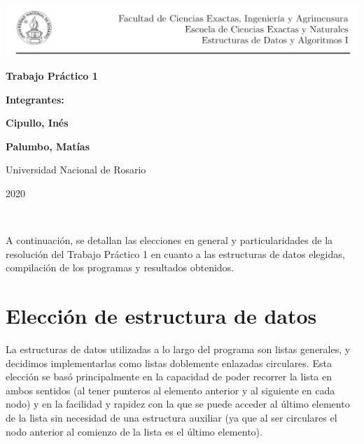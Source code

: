 \documentclass[11pt]{article}
\begin{document}
\begin{titlepage}
    \hspace{-1.2cm}\includegraphics[scale= 0.8]{header2}
    \begin{center}
        \vfill
        \vfill
            \vspace{0.7cm}
            \noindent\textbf{\Huge Trabajo Práctico 1}\par
            \vspace{.5cm}
        \vfill
        \noindent \textbf{\huge Integrantes:}\par
        \vspace{.5cm}
        \noindent \textbf{\Large Cipullo, Inés}\par
        \noindent \textbf{\Large Palumbo, Matías}\par
        
 
        \vfill
        \large Universidad Nacional de Rosario \par
        \noindent\large 2020
             
    \end{center}
 \end{titlepage}
 \ \par
\noindent A continuación, se detallan las elecciones en general y particularidades de la resolución del Trabajo Práctico 1 en cuanto a las estructuras de datos elegidas, compilación de los programas y resultados obtenidos.\par

\section{Elección de estructura de datos}

La estructuras de datos utilizadas a lo largo del programa son listas generales, y decidimos implementarlas como listas doblemente enlazadas circulares. Esta elección se basó principalmente en la capacidad de poder recorrer la lista en ambos sentidos (al tener punteros al elemento anterior y al siguiente en cada nodo) y en la facilidad y rapidez con la que se puede acceder al último elemento de la lista sin necesidad de una estructura auxiliar (ya que al ser circulares el nodo anterior al comienzo de la lista es el último elemento).\par
\end{document}
